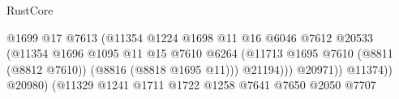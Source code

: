 \begin{lexlean}{RustCore}
\begin{coremodule}
                                                                  @1699
                                                                  @17
                                                                  @7613
                                                                  (@11354
                                                                    @1224
                                                                    @1698
                                                                    @11
                                                                    @16
                                                                    @6046
                                                                    @7612
                                                                    @20533
                                                                    (@11354
                                                                      @1696
                                                                      @1095
                                                                      @11
                                                                      @15
                                                                      @7610
                                                                      @6264
                                                                      (@11713
                                                                        @1695
                                                                        @7610
                                                                        (@8811 (@8812 @7610))
                                                                        (@8816 (@8818 @1695 @11)))
                                                                      @21194)))
                                                                @20971))
                                                            @11374))
                                                        @20980)
                                                      (@11329
                                                        @1241
                                                        @1711
                                                        @1722
                                                        @1258
                                                        @7641
                                                        @7650
                                                        @2050
                                                        @7707

\end{coremodule}
\end{lexlean}
